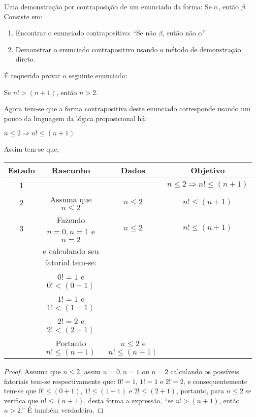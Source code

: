 \begin{method}[Contraposição]\label{metodo:Contraposição}
	Uma demonstração por contraposição de um enunciado da forma: Se $\alpha$, então $\beta$. Consiste em:
	\begin{enumerate}
		\item Encontrar o enunciado contrapositivo: ``Se não $\beta$, então não $\alpha$''
		\item Demonstrar o enunciado contrapositivo usando o método de demonstração direto.
	\end{enumerate}
\end{method}

\begin{exem}\label{exe:DemonstracaoImplicacao3}
	É requerido provar o seguinte enunciado:
	\begin{center}
		Se $n! > (n+1)$, então $n > 2$.
	\end{center}
	Agora tem-se que a forma contrapositiva deste enunciado corresponde  usando um pouco da linguagem da lógica proposicional há:
	\begin{center}
		$n \leq  2 \Rightarrow n! \leq (n+1)$
	\end{center}
	Assim tem-se que,
	\begin{table*}[h]
		\centering
		\begin{tabular}{c|c|c|c}
			\hline
			\rowcolor{cinzaClaro}
			Estado & Rascunho & Dados & Objetivo\\
			\hline
			1 & & & $n \leq  2 \Rightarrow n! \leq (n+1)$\\
			2 & Assuma que  $n \leq 2$ & $n \leq 2$ & $n! \leq (n+1)$\\
			3 & Fazendo $n = 0, n = 1$ e $n=2$  & $n \leq 2$ & $n! \leq (n+1)$\\
			& e calculando seu fatorial tem-se: & & \\
			& $0! = 1$ e $0! < (0+1)$ & & \\
			& $1! = 1$ e $1! < (1+1)$ & & \\  
			& $2! = 2$ e $2! < (2+1)$ & & \\ 
			& Portanto $n! \leq (n+1)$ & $n \leq 2$ e $n! \leq (n+1)$ &\\
			\hline
		\end{tabular}
	\end{table*}

	\begin{proof}
		Assuma que $n \leq 2$, assim $n = 0, n = 1$ ou $n=2$ calculando os possíveis fatoriais tem-se respectivamente que: $0! = 1$, $1! = 1$ e $2! = 2$, e consequentemente tem-se que $0! \leq (0+1)$, $1! \leq (1+1)$ e $2! \leq (2+1)$, portanto, para $n \leq  2$ se verifica que $n! \leq (n+1)$, desta forma a expressão, ``se $n! > (n+1)$, então $n > 2$.'' É também verdadeira.
	\end{proof}
\end{exem}

